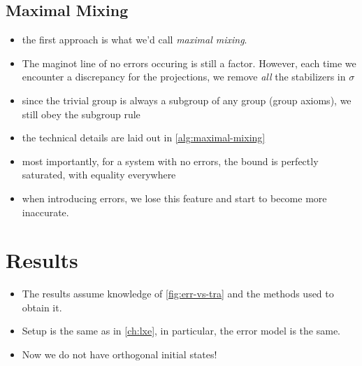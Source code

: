 \subsection{Maximal Mixing}\label{sec:maximal-mixing}
\begin{itemize}
  \item the first approach is what we'd call \emph{maximal mixing}.
  \item The maginot line of no errors occuring is still a factor. However, each
    time we encounter a discrepancy for the projections, we remove \emph{all}
    the stabilizers in $\sigma$
  \item since the trivial group is always a subgroup of any group (group
    axioms), we still obey the subgroup rule
  \item the technical details are laid out in \cref{alg:maximal-mixing}
  \item most importantly, for a system with no errors, the bound is perfectly
    saturated, with equality everywhere
  \item when introducing errors, we lose this feature and start to become more
    inaccurate.
\end{itemize}

\section{Results}\label{sec:upperbound-results}
\begin{itemize}
  \item The results assume knowledge of \cref{fig:err-vs-tra} and the methods
    used to obtain it.
  \item Setup is the same as in \cref{ch:lxe}, in particular, the error model
    is the same.
  \item Now we do not have orthogonal initial states!
\end{itemize}
